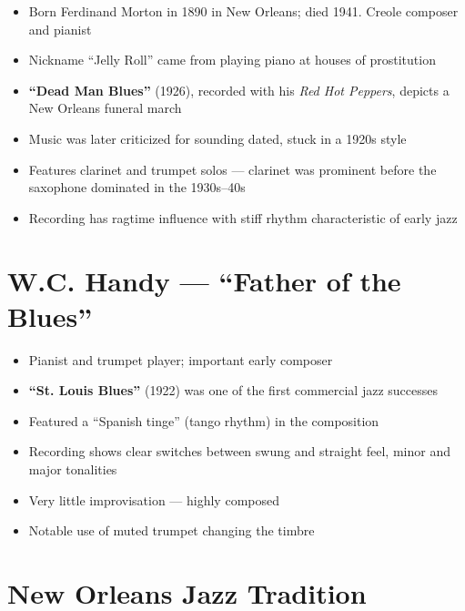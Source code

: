 \documentclass[11pt, letterpaper]{article}
\begin{document}
\begin{itemize}
    \item Born Ferdinand Morton in 1890 in New Orleans; died 1941. Creole composer and pianist
    \item Nickname ``Jelly Roll'' came from playing piano at houses of prostitution
    \item \textbf{``Dead Man Blues''} (1926), recorded with his \textit{Red Hot Peppers}, depicts a New Orleans funeral march
    \item Music was later criticized for sounding dated, stuck in a 1920s style
    \item Features clarinet and trumpet solos --- clarinet was prominent before the saxophone dominated in the 1930s--40s
    \item Recording has ragtime influence with stiff rhythm characteristic of early jazz
\end{itemize}

\section{W.C. Handy --- ``Father of the Blues''}

\begin{itemize}
    \item Pianist and trumpet player; important early composer
    \item \textbf{``St. Louis Blues''} (1922) was one of the first commercial jazz successes
    \item Featured a ``Spanish tinge'' (tango rhythm) in the composition
    \item Recording shows clear switches between swung and straight feel, minor and major tonalities
    \item Very little improvisation --- highly composed
    \item Notable use of muted trumpet changing the timbre
\end{itemize}

\section{New Orleans Jazz Tradition}
\end{document}
